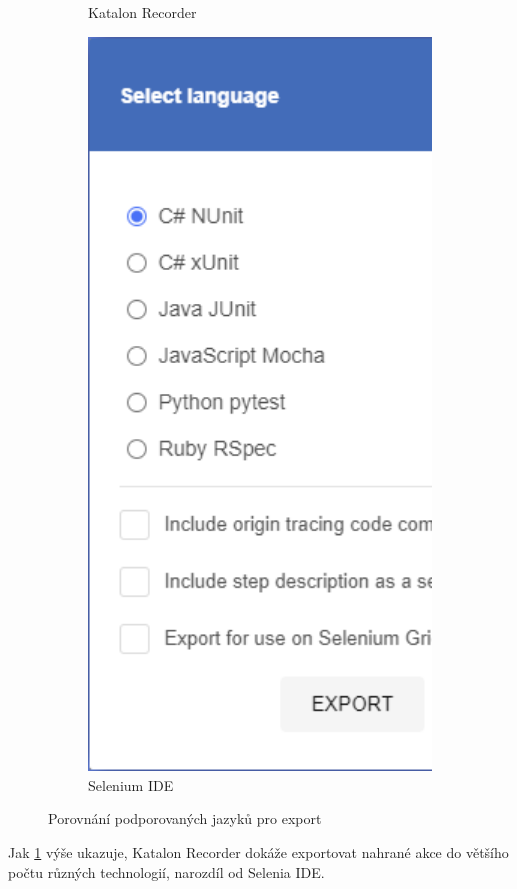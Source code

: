 \documentclass[12pt, a4paper, twoside]{article}
\begin{document}
\begin{figure}[H]
\begin{subfigure}[t]{0.6\textwidth}
			\caption{Katalon Recorder}
		\end{subfigure} \hfill
		\begin{subfigure}[t]{0.37\textwidth}
			\includegraphics[width=1.0\textwidth, center]{seleniumIdeExport.png}
			\caption{Selenium IDE}
		\end{subfigure}
		\caption{Porovnání podporovaných jazyků pro export}
		\label{fig:katalonExportComparison}
	\end{figure}
	Jak \cref{fig:katalonExportComparison} výše ukazuje, Katalon Recorder dokáže exportovat nahrané akce do většího počtu různých technologií, narozdíl od Selenia IDE.
	
\end{document}
